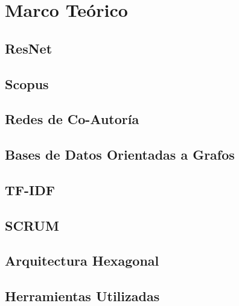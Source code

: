 \section{Marco Teórico}
\label{chapter01-section03:marcoTeorico}
\subsection{ResNet}
\label{chapter01-section03:ResNet}


\subsection{Scopus}
\label{chapter01-section03:Scopus}


\subsection{Redes de Co-Autoría}
\label{chapter01-section03:Redes de Co-Autoria}


\subsection{Bases de Datos Orientadas a Grafos}
\label{Chapter01-section3:Bases de datos orientadas a grados}


\subsection{TF-IDF}
\label{Chapter01-section3:TD-IDF}


\subsection{SCRUM}
\label{Chapter01-section3:SCRUM}



\subsection{Arquitectura Hexagonal}
\label{Chapter01-section3:Arquitectura Hexagonal}


\subsection{Herramientas Utilizadas}
\label{Chapter01-section3:Herramientas utilizadas}

